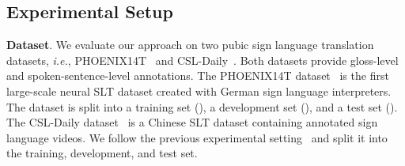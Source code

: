 \documentclass[10pt,twocolumn,letterpaper]{article}
\begin{document}
     \setlength{\tabcolsep}{4.3pt}
      \begin{table*}[!htb]
         \centering
         \vspace{1mm}
         \caption{Performance comparison of IP-SLT with methods for SLT on CSL-Daily.
         `LLM' denotes adopting pre-trained large language models.
         }
         \label{tab:slt-csl}
         \vspace{-1mm}
     \end{table*}
     
     
    \subsection{Experimental Setup}
    \smallskip
    \noindent \textbf{Dataset}.
    We evaluate our approach on two pubic sign language translation datasets, \emph{i.e.}, PHOENIX14T~\cite{camgoz2018neural} and CSL-Daily~\cite{zhou2021improving}. 
    Both datasets provide gloss-level and spoken-sentence-level annotations.
    The PHOENIX14T dataset~\cite{camgoz2018neural} is the first large-scale neural SLT dataset created with  German sign language interpreters. 
    The dataset is split into a training set (), a development set (), and a test set ().
    The CSL-Daily dataset~\cite{zhou2021improving} is a Chinese SLT dataset containing  annotated sign language videos. We follow the previous experimental setting~\cite{zhou2021improving} and split it into the training, development, and test set.
\end{document}
